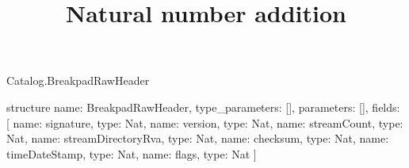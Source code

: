 \begin{lexlean}{Catalog.BreakpadRawHeader}
\title{Natural number addition}
\begin{semanticmodule}
structure{
  name: BreakpadRawHeader,
  type_parameters: [],
  parameters: [],
  fields: [
    {name: signature, type: Nat},
    {name: version, type: Nat},
    {name: streamCount, type: Nat},
    {name: streamDirectoryRva, type: Nat},
    {name: checksum, type: Nat},
    {name: timeDateStamp, type: Nat},
    {name: flags, type: Nat}
  ]
}
\end{semanticmodule}
\end{lexlean}
